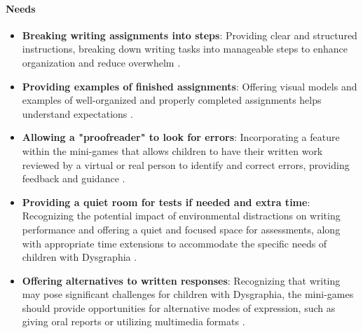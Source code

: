 \paragraph{Needs}
\begin{itemize}
    \item \textbf{Breaking writing assignments into steps}: Providing clear and structured instructions, breaking down writing tasks into manageable steps to enhance organization and reduce overwhelm \cite{understood_accommodations}.
    \item \textbf{Providing examples of finished assignments}: Offering visual models and examples of well-organized and properly completed assignments helps understand expectations \cite{understood_accommodations}.
    \item \textbf{Allowing a "proofreader" to look for errors}: Incorporating a feature within the mini-games that allows children to have their written work reviewed by a virtual or real person to identify and correct errors, providing feedback and guidance \cite{understood_accommodations}.
    \item \textbf{Providing a quiet room for tests if needed and extra time}: Recognizing the potential impact of environmental distractions on writing performance and offering a quiet and focused space for assessments, along with appropriate time extensions to accommodate the specific needs of children with Dysgraphia \cite{understood_accommodations}.
    \item \textbf{Offering alternatives to written responses}: Recognizing that writing may pose significant challenges for children with Dysgraphia, the mini-games should provide opportunities for alternative modes of expression, such as giving oral reports or utilizing multimedia formats \cite{understood_accommodations}.
\end{itemize}